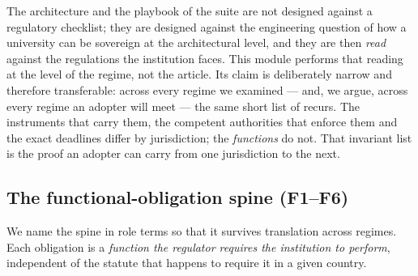 The architecture and the playbook of the  suite are
not designed against a regulatory checklist; they are designed against
the engineering question of how a university can be
sovereign at the architectural level, and they are then \emph{read}
against the regulations the institution faces. This module performs
that reading at the level of the regime, not the article. Its claim is
deliberately narrow and therefore transferable: across every regime we
examined --- and, we argue, across every regime an adopter will meet
--- the same short list of  recurs.
The instruments that carry them, the competent authorities that
enforce them and the exact deadlines differ by jurisdiction; the
\emph{functions} do not. That invariant list is the proof an adopter
can carry from one jurisdiction to the next.

\subsection{The functional-obligation spine (F1--F6)}
\label{sec:reg-spine}

We name the spine in role terms so that it survives translation across
regimes. Each obligation is a \emph{function the regulator requires the
institution to perform}, independent of the statute that happens to
require it in a given country.

